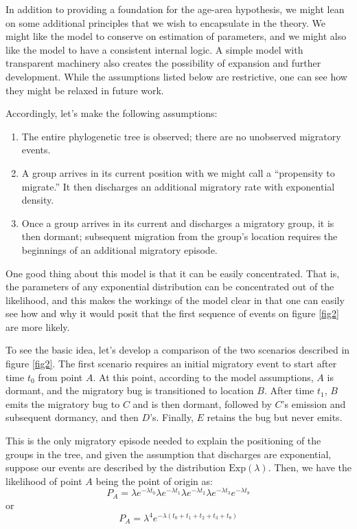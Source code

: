 \documentclass[11pt]{article}
\begin{document}
In addition to providing a foundation for the age-area hypothesis, we might lean on some additional principles that we wish to encapsulate in the theory. We might like the model to conserve on estimation of parameters, and we might also like the model to have a consistent internal logic. A simple model with transparent machinery also creates the possibility of expansion and further development. While the assumptions listed below are restrictive, one can see how they might be relaxed in future work.

Accordingly, let's make the following assumptions:
\begin{enumerate}
\item The entire phylogenetic tree is observed; there are no unobserved migratory events.
\item A group arrives in its current position with we might call a ``propensity to migrate.'' It then discharges an additional migratory rate with exponential density.
\item Once a group arrives in its current and discharges a migratory group, it is then dormant; subsequent migration from the group's location requires the beginnings of an additional migratory episode.
\end{enumerate}

One good thing about this model is that it can be easily concentrated. That is, the parameters of any exponential distribution can be concentrated out of the likelihood, and this makes the workings of the model clear in that one can easily see how and why it would posit that the first sequence of events on figure \ref{fig2} are more likely.

To see the basic idea, let's develop a comparison of the two scenarios described in figure \ref{fig2}. The first scenario requires an initial migratory event to start after time $t_0$ from point $A$. At this point, according to the model assumptions, $A$ is dormant, and the migratory bug is transitioned to location $B$. After time $t_1$, $B$ emits the migratory bug to $C$ and is then dormant, followed by $C$'s emission and subsequent dormancy, and then $D$'s. Finally, $E$ retains the bug but never emits. 

This is the only migratory episode needed to explain the positioning of the groups in the tree, and given the assumption that discharges are exponential, suppose our events are described by the distribution $\textrm{Exp}(\lambda)$. Then, we have the likelihood of point $A$ being the point of origin as:
\begin{equation} \label{e1}
P_A = \lambda e^{-\lambda t_0}\lambda e^{-\lambda t_1}\lambda e^{-\lambda t_2}\lambda e^{-\lambda t_3}e^{-\lambda t_8}
\end{equation}
or 
\begin{equation} \label{e2}
P_A = \lambda^4 e^{-\lambda (t_0+t_1+t_2+t_3+t_8)}
\end{equation}
\end{document}
